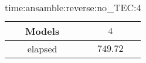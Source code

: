 \begin{table}[!ht]
	\centering
	\begin{tabular}{|c|c|}
		\hline
		Models & $4$ \\ \hline
		elapsed & $749.72$ \\ \hline
	\end{tabular}
	\caption{time:ansamble:reverse:no_TEC:4}
	\label{tab:time:ansamble:reverse:no_TEC:4}
\end{table}

